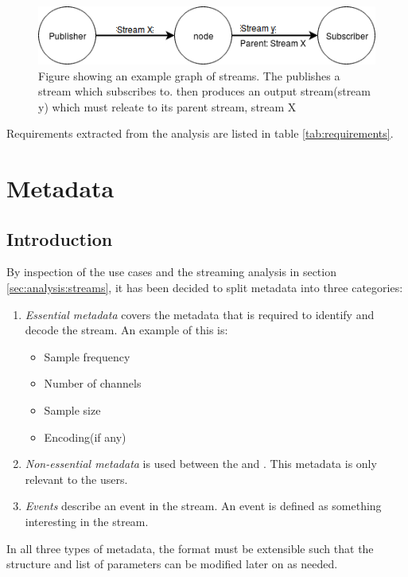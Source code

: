 \begin{figure}[h!]
	\centering
	\includegraphics[width=1\textwidth]{figures/stream-graph}
	\caption{Figure showing an example graph of streams. The  publishes a stream which  subscribes to.  then produces an output stream(stream y) which must releate to its parent stream, stream X} \label{fig:analysis:graph}
\end{figure}

Requirements extracted from the analysis are listed in table \ref{tab:requirements}.

\section{Metadata} \label{sec:analysis:metadata}
\subsection{Introduction}

By inspection of the use cases and the streaming analysis in section \ref{sec:analysis:streams}, it has been decided to split metadata into three categories:
\begin{enumerate}
	\item \textit{Essential metadata} covers the metadata that is required to identify and decode the stream.
		An example of this is:
		\begin{itemize}
			\item Sample frequency
			\item Number of channels
			\item Sample size
			\item Encoding(if any)
		\end{itemize}
	\item \textit{Non-essential metadata} is used between the  and . This metadata is only relevant to the users.
	\item \textit{Events} describe an event in the stream. An event is defined as something interesting in the stream.
\end{enumerate}

In all three types of metadata, the format must be extensible such that the structure and list of parameters can be modified later on as needed.

